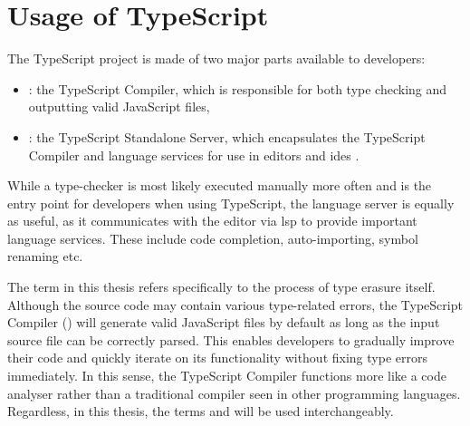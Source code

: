 \section{Usage of TypeScript}

The TypeScript project is made of two major parts available to developers:

\begin{itemize}
  \item {}: the TypeScript Compiler, which is responsible for both type checking and outputting valid JavaScript files,
  \item {}: the TypeScript Standalone Server, which encapsulates the TypeScript Compiler and language services for use in editors and \acrshort{ide}s \cite{StandaloneServerTsserver}.
\end{itemize}

While a type-checker is most likely executed manually more often and is the entry point for developers when using TypeScript, the language server is equally as useful, as it communicates with the editor via \acrfull{lsp} to provide important language services. These include code completion, auto-importing, symbol renaming etc.

The term  in this thesis refers specifically to the process of type erasure itself. Although the source code may contain various type-related errors, the TypeScript Compiler () will generate valid JavaScript files by default as long as the input source file can be correctly parsed. This enables developers to gradually improve their code and quickly iterate on its functionality without fixing type errors immediately. In this sense, the TypeScript Compiler functions more like a code analyser rather than a traditional compiler seen in other programming languages. Regardless, in this thesis, the terms  and  will be used interchangeably.
